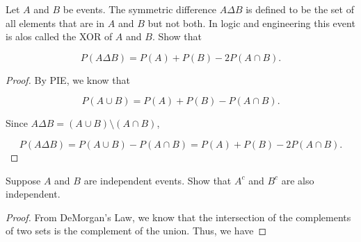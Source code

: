 \documentclass[answers]{exam}
\begin{document}
\begin{questions}

\question [15] Let $A$ and $B$ be events. The symmetric difference $A\Delta B$ 
is defined to be the set of all elements that are in $A$ and $B$ but not both.
In logic and engineering this event is alos called the XOR of $A$ and $B$. 
Show that 

\[
P(A \Delta B) = P(A) + P(B) - 2P(A \cap B)
.\] 

\begin{solution}
\begin{proof}
By PIE, we know that 

\[
P(A \cup B) = P(A) + P(B) - P(A \cap B)
.\] 

Since $A \Delta B = (A \cup B) \setminus (A \cap B)$,

\[
P(A \Delta B) = P(A \cup B) - P(A \cap B) = P(A) + P(B) - 2P(A \cap B)
.\] 
\end{proof}
\end{solution}

\question [10] Suppose $A$ and $B$ are independent events. Show that $A^{c}$
and $B^{c}$ are also independent.

\begin{solution}
\begin{proof}
From DeMorgan's Law, we know that the intersection of the complements of 
two sets is the complement of the union. Thus, we have


\end{proof}
\end{solution}
\end{questions}
\end{document}
